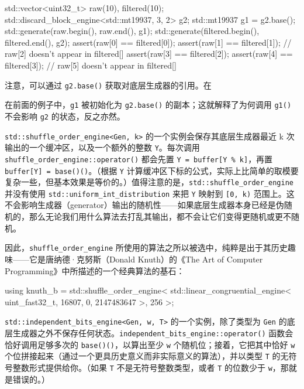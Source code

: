 \begin{codebox}[cpp]
     std::vector<uint32_t> raw(10), filtered(10);
     std::discard_block_engine<std::mt19937, 3, 2> g2;
     std::mt19937 g1 = g2.base();
     std::generate(raw.begin(), raw.end(), g1);
     std::generate(filtered.begin(), filtered.end(), g2);
     assert(raw[0] == filtered[0]);
     assert(raw[1] == filtered[1]);
       // raw[2] doesn't appear in filtered[]
     assert(raw[3] == filtered[2]);
     assert(raw[4] == filtered[3]);
       // raw[5] doesn't appear in filtered[]
\end{codebox}

注意，可以通过 \texttt{g2.base(\allowbreak{})\allowbreak{}} 获取对底层生成器的引用。在

在前面的例子中，\texttt{g1} 被初始化为 \texttt{g2.base(\allowbreak{})\allowbreak{}} 的副本；这就解释了为何调用 \texttt{g1(\allowbreak{})\allowbreak{}} 不会影响 \texttt{g2} 的状态，反之亦然。

\texttt{std::\allowbreak{}shuffle\_\allowbreak{}order\_\allowbreak{}engine<\allowbreak{}Gen,\allowbreak{} k>\allowbreak{}} 的一个实例会保存其底层生成器最近 k 次输出的一个缓冲区，以及一个额外的整数 \texttt{Y}。每次调用 \texttt{shuffle\_\allowbreak{}order\_\allowbreak{}engine::\allowbreak{}operator(\allowbreak{})\allowbreak{}} 都会先置 \texttt{Y = buffer[Y \% k]}，再置 \texttt{buffer[Y] = base(\allowbreak{})\allowbreak{}(\allowbreak{})\allowbreak{}}。（根据 \texttt{Y} 计算缓冲区下标的公式，实际上比简单的取模要复杂一些，但基本效果是等价的。）值得注意的是，\texttt{std::\allowbreak{}shuffle\_\allowbreak{}order\_\allowbreak{}engine} 并没有使用 \texttt{std::\allowbreak{}uniform\_\allowbreak{}int\_\allowbreak{}distribution} 来把 \texttt{Y} 映射到 \texttt{[0,\allowbreak{} k)\allowbreak{}} 范围上。这不会影响生成器（generator）输出的随机性——如果底层生成器本身已经是伪随机的，那么无论我们用什么算法去打乱其输出，都不会让它们变得更随机或更不随机。

因此，\texttt{shuffle\_\allowbreak{}order\_\allowbreak{}engine} 所使用的算法之所以被选中，纯粹是出于其历史趣味——它是唐纳德·克努斯（Donald Knuth）的《The Art of Computer Programming》中所描述的一个经典算法的基石：

\begin{codebox}[cpp]
    using knuth_b = std::shuffle_order_engine<
      std::linear_congruential_engine<
        uint_fast32_t, 16807, 0, 2147483647
      >,
      256
    >;
\end{codebox}

\texttt{std::\allowbreak{}independent\_\allowbreak{}bits\_\allowbreak{}engine<\allowbreak{}Gen,\allowbreak{} w,\allowbreak{} T>\allowbreak{}} 的一个实例，除了类型为 \texttt{Gen} 的底层生成器之外不保存任何状态。\texttt{independent\_\allowbreak{}bits\_\allowbreak{}engine::\allowbreak{}operator(\allowbreak{})\allowbreak{}} 函数会恰好调用足够多次的 \texttt{base(\allowbreak{})\allowbreak{}(\allowbreak{})\allowbreak{}}，以算出至少 \texttt{w} 个随机位；接着，它把其中恰好 \texttt{w} 个位拼接起来（通过一个更具历史意义而非实际意义的算法），并以类型 \texttt{T} 的无符号整数形式提供给你。（如果 \texttt{T} 不是无符号整数类型，或者 \texttt{T} 的位数少于 \texttt{w}，那就是错误的。）

